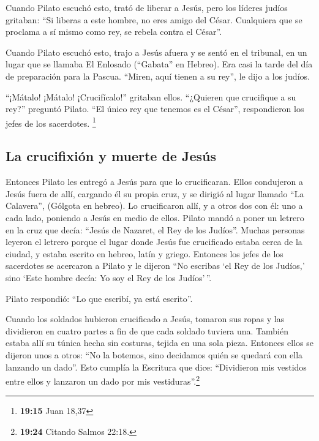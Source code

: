  Cuando Pilato escuchó esto, trató de liberar a Jesús,
pero los líderes judíos gritaban: ``Si liberas a este hombre, no eres
amigo del César. Cualquiera que se proclama a sí mismo como rey, se
rebela contra el César''.

 Cuando Pilato escuchó esto, trajo a Jesús afuera y se
sentó en el tribunal, en un lugar que se llamaba El Enlosado (``Gabata''
en Hebreo).  Era casi la tarde del día de preparación
para la Pascua. ``Miren, aquí tienen a su rey'', le dijo a los judíos.

 ``¡Mátalo! ¡Mátalo! ¡Crucifícalo!'' gritaban ellos.
``¿Quieren que crucifique a su rey?'' preguntó Pilato. ``El único rey
que tenemos es el César'', respondieron los jefes de los sacerdotes.
\footnote{\textbf{19:15} Juan 18,37}

\hypertarget{la-crucifixiuxf3n-y-muerte-de-jesuxfas}{%
\subsection{La crucifixión y muerte de
Jesús}\label{la-crucifixiuxf3n-y-muerte-de-jesuxfas}}

 Entonces Pilato les entregó a Jesús para que lo
crucificaran.  Ellos condujeron a Jesús fuera de allí,
cargando él su propia cruz, y se dirigió al lugar llamado ``La
Calavera'', (Gólgota en hebreo).  Lo crucificaron allí, y
a otros dos con él: uno a cada lado, poniendo a Jesús en medio de ellos.
 Pilato mandó a poner un letrero en la cruz que decía:
``Jesús de Nazaret, el Rey de los Judíos''.  Muchas
personas leyeron el letrero porque el lugar donde Jesús fue crucificado
estaba cerca de la ciudad, y estaba escrito en hebreo, latín y griego.
 Entonces los jefes de los sacerdotes se acercaron a
Pilato y le dijeron ``No escribas `el Rey de los Judíos,' sino `Este
hombre decía: Yo soy el Rey de los Judíos'\,''.

 Pilato respondió: ``Lo que escribí, ya está escrito''.

 Cuando los soldados hubieron crucificado a Jesús,
tomaron sus ropas y las dividieron en cuatro partes a fin de que cada
soldado tuviera una. También estaba allí su túnica hecha sin costuras,
tejida en una sola pieza.  Entonces ellos se dijeron unos
a otros: ``No la botemos, sino decidamos quién se quedará con ella
lanzando un dado''. Esto cumplía la Escritura que dice: ``Dividieron mis
vestidos entre ellos y lanzaron un dado por mis vestiduras''.\footnote{\textbf{19:24}
  Citando Salmos 22:18.}

